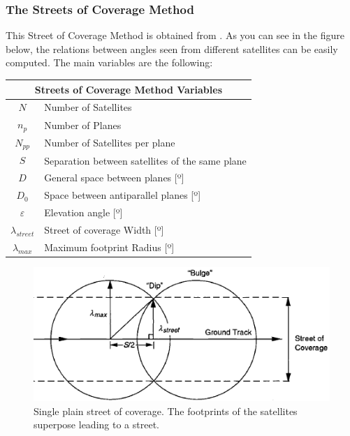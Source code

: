 \subsubsection{The Streets of Coverage Method}
This  Street of Coverage Method is obtained from 
\cite{OrbitalMechanics}. As you can see in the figure below,
 the relations between angles seen from different satellites can
 be easily computed. The main variables are the following:

\begin{table}[H]
\centering
\begin{tabular}{|c|l|}
\hline
\multicolumn{2}{|c|}{Streets of Coverage Method Variables}     \\ \hline
$$N$$              & Number of Satellites                      \\ \hline
$n_{p}$            & Number of Planes                          \\ \hline
$N_{pp}$           & Number of Satellites per plane            \\ \hline
$$S$$              & Separation between satellites of the same plane \\ \hline
$$D$$              & General space between planes {[}º{]}      \\ \hline
$D_{0}$            & Space between antiparallel planes {[}º{]} \\ \hline
$\varepsilon$      & Elevation angle {[}º{]}                   \\ \hline
$\lambda_{street}$ & Street of coverage Width {[}º{]}          \\ \hline
$\lambda_{max}$    & Maximum footprint Radius {[}º{]}          \\ \hline
\end{tabular}
\end{table}  

\begin{figure}[H]
\begin{center}
\includegraphics[scale=0.7]{PolarOrbits/planestreet.png}
\caption{Single plain street of coverage. The footprints of the satellites superpose leading to a street.}
\end{center}
\end{figure}

